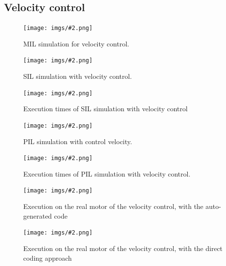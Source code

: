 \documentclass[11pt,a4paper,oneside]{extarticle}
\newcommand\img[3]{
    \begin{figure}[H]\centering
        \texttt{[image: imgs/\#2.png]}
        \caption{#3}
        \label{fig:#2}
    \end{figure}
}
\begin{document}
\subsection{Velocity control}
\img{1}{Speed_State_Feedback_Simulation}{MIL simulation for velocity control.}
\newpage
\img{1}{Speed_State_Feedback_SIL_Simulation}{SIL simulation with velocity control.}
\img{1}{Speed_State_Feedback_SIL_Code_Profiling}{Execution times of SIL simulation with velocity control}
\img{1}{Speed_State_Feedback_PIL_Simulation}{PIL simulation with control velocity.}
\img{1}{Speed_State_Feedback_PIL_Code_Profiling}{Execution times of PIL simulation with velocity control.}
\img{1}{Speed_State_Feedback_Motor_Simulation}{Execution on the real motor of the velocity control, with the auto-generated code}
\img{1}{Speed_State_Feedback_Direct_Coding}{Execution on the real motor of the velocity control, with the direct coding approach}

\newpage
\end{document}
